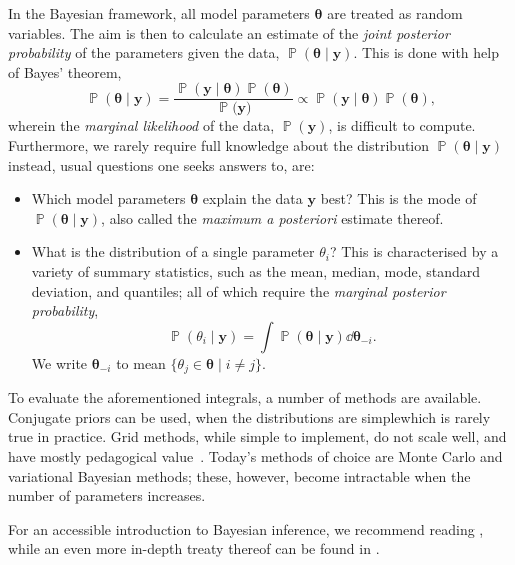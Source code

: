 \documentclass[british]{scrreprt}
\DeclareMathOperator{\prob}{\mathbb{P}}
\begin{document}
In the Bayesian framework, all model parameters \( \symbf{\theta} \) are treated as random variables. The aim is then to calculate an estimate of the \textit{joint posterior probability} of the parameters given the data, \( \prob(\symbf{\theta} \mid \symbf{y}) \). This is done with help of Bayes' theorem,
\begin{equation}
    \prob(\symbf{\theta} \mid \symbf{y})
        = \frac{\prob(\symbf{y} \mid \symbf{\theta}) \prob(\symbf{\theta})}{\prob(\symbf{y)}}
        \propto \prob(\symbf{y} \mid \symbf{\theta}) \prob(\symbf{\theta})
    \label{eq:bayes-thm}
    \text{,}
\end{equation}
wherein the \textit{marginal likelihood} of the data, \( \prob(\symbf{y}) \), is difficult to compute. Furthermore, we rarely require full knowledge about the distribution \( \prob(\symbf{\theta} \mid \symbf{y}) \)\textemdash{}instead, usual questions one seeks answers to, are:
\begin{itemize}
    \item Which model parameters \( \symbf{\theta} \) explain the data \( \symbf{y} \) best? This is the mode of \( \prob(\symbf{\theta} \mid \symbf{y}) \), also called the \textit{maximum a posteriori} estimate thereof.
    \item What is the distribution of a single parameter \( \theta_{i} \)? This is characterised by a variety of summary statistics, such as the mean, median, mode, standard deviation, and quantiles; all of which require the \textit{marginal posterior probability},
    \begin{equation}
        \prob(\theta_{i} \mid \symbf{y}) = \int \prob(\symbf{\theta} \mid \symbf{y}) \dd \symbf{\theta}_{-i}
        \text{.}
    \end{equation}
    We write \( \symbf{\theta}_{-i} \) to mean \( \{ \theta_{j} \in \symbf{\theta} \mid i \neq j \} \).
\end{itemize}
To evaluate the aforementioned integrals, a number of methods are available. Conjugate priors can be used, when the distributions are simple\textemdash{}which is rarely true in practice. Grid methods, while simple to implement, do not scale well, and have mostly pedagogical value~\cite{McElreathStatisticalrethinkingBayesian2020}. Today's methods of choice are Monte Carlo  and variational Bayesian methods; these, however, become intractable when the number of parameters increases.

For an accessible introduction to Bayesian inference, we recommend reading \cite{McElreathStatisticalrethinkingBayesian2020}, while an even more in-depth treaty thereof can be found in \cite{GelmanBayesianDataAnalysis2013}.
\end{document}
